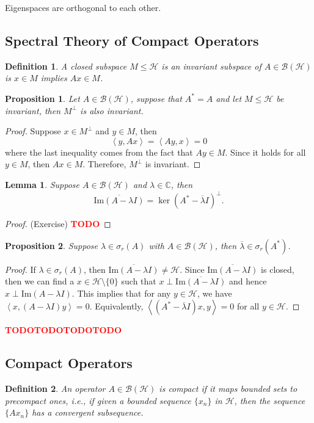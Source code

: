 \documentclass{article}
\newtheorem*{proposition}{Proposition}
\newtheorem*{lemma}{Lemma}
\newtheorem*{definition}{Definition}
\newcommand{\C}{\mathbb{C}}
\newcommand{\B}{\mathcal{B}}
\renewcommand{\H}{\mathcal{H}}
\newcommand{\inner}[2]{\left\langle#1 , #2 \right\rangle}
\renewcommand{\Im}{\text{Im}}
\newcommand{\td}{\textcolor{red}{\textbf{TODO}}}
\begin{document}
Eigenspaces are orthogonal to each other.

\subsection{Spectral Theory of Compact Operators}

\begin{definition}
    A closed subspace $M \leq \H$ is an invariant subspace of $A \in \B(\H)$ is $x \in M$ implies $Ax \in M$.
\end{definition}

\begin{proposition}
    Let $A \in \B(\H)$, suppose that $A^* = A$ and let $M \leq \H$ be invariant, then $M^{\perp}$ is also invariant.
\end{proposition}

\begin{proof}
    Suppose $x \in M^{\perp}$ and $y \in M$, then
    $$\inner{y}{Ax} = \inner{Ay}{x} = 0$$
    where the last inequality comes from the fact that $Ay \in M$. Since it holds for all $y \in M$, then $Ax \in M$. Therefore, $M^{\perp}$ is invariant.
\end{proof}

\begin{lemma}
    Suppose $A \in \B(\H)$ and $\lambda \in \C$, then 
    $$\overline{\Im(A - \lambda I)} = \ker(A^* - \overline{\lambda} I)^{\perp}.$$
\end{lemma}

\begin{proof}
    (Exercise) \td
\end{proof}

\begin{proposition}
    Suppose $\lambda \in \sigma_r(A)$ with $A \in \B(\H)$, then $\overline{\lambda} \in \sigma_r(A^*)$.
\end{proposition}

\begin{proof}
    If $\lambda \in \sigma_r(A)$, then $\overline{\Im(A - \lambda I)} \neq \H$. Since $\overline{\Im(A - \lambda I)}$ is closed, then we can find a $x \in \H \setminus \{0\}$ such that $x \perp \overline{\Im(A - \lambda I)}$ and hence $x \perp \Im(A - \lambda I)$. This implies that for any $y \in \H$, we have $\inner{x}{(A - \lambda I)y} = 0$. Equivalently, $\inner{(A^* - \overline{\lambda} I)x}{y} = 0$ for all $y \in \H$.
\end{proof}

\td \td \td \td

\subsection{Compact Operators}

\begin{definition}
    An operator $A \in \B(\H)$ is compact if it maps bounded sets to precompact ones, i.e., if given a bounded sequence $\{x_n\}$ in $\H$, then the sequence $\{Ax_n\}$ has a convergent subsequence.
\end{definition}
\end{document}
